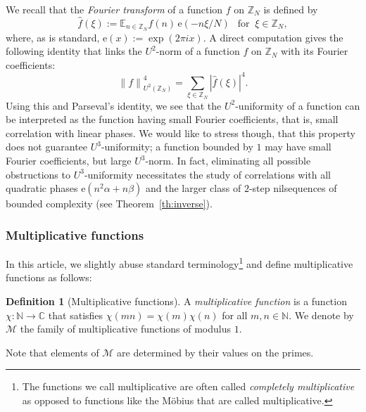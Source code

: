 \documentclass[11pt]{amsart}
\theoremstyle{definition}
\newtheorem*{definition}{Definition}
\begin{document}
We recall that the \emph{Fourier transform} of a function $f$ on
${{\mathbb Z}}_N$ is defined by
$$
\widehat f(\xi):={{\mathbb E}}_{n\in{{\mathbb Z}}_N}f(n)\,{\mathrm{e}}(-n\xi/N)\ \ \text{ for }\
\xi\in{{\mathbb Z}}_N,
$$
where, as is standard, ${\mathrm{e}}(x):=\exp(2\pi ix)$.  A direct computation
gives the following identity that links the $U^2$-norm of a function
$f$ on ${{\mathbb Z}}_N$ with its Fourier coefficients:
\begin{equation}\label{E:U2formula}
{\lVert {f} \rVert}_{U^{2}({{\mathbb Z}}_N)}^4=\sum_{\xi\in{{\mathbb Z}}_N}|\widehat f(\xi)|^4.
\end{equation}
Using this and Parseval's identity, we see that the
$U^2$-uniformity of a function can be interpreted as the function
having small Fourier coefficients, that is, small correlation with
linear phases. We would like to stress though,
  that this property does not guarantee $U^3$-uniformity; a
function bounded by $1$  may have small  Fourier coefficients, but large
$U^3$-norm. In fact, eliminating all possible obstructions to
$U^3$-uniformity necessitates the study of correlations with all
 quadratic phases ${\mathrm{e}}(n^2\alpha+n\beta)$ and the larger class of $2$-step nilsequences
 of bounded complexity (see Theorem~\ref{th:inverse}).

\subsubsection*{Multiplicative functions} In this article, we slightly abuse
 standard terminology\footnote{The functions we call multiplicative
are often called \emph{completely multiplicative} as opposed to
functions like the M\"obius  that are  called multiplicative.}
and define multiplicative functions as follows:
\begin{definition}[Multiplicative functions] A
\emph{multiplicative function} is a function  $\chi\colon {{\mathbb N}}\to {{\mathbb C}}$
that satisfies  $\chi(mn)=\chi(m)\chi(n)$ for all $m,n\in{{\mathbb N}}$. We
denote by ${{\mathcal M}}$ the family of multiplicative functions of modulus
$1$.
\end{definition}
Note that elements of ${{\mathcal M}}$ are   determined by their values on the
primes.
\end{document}
